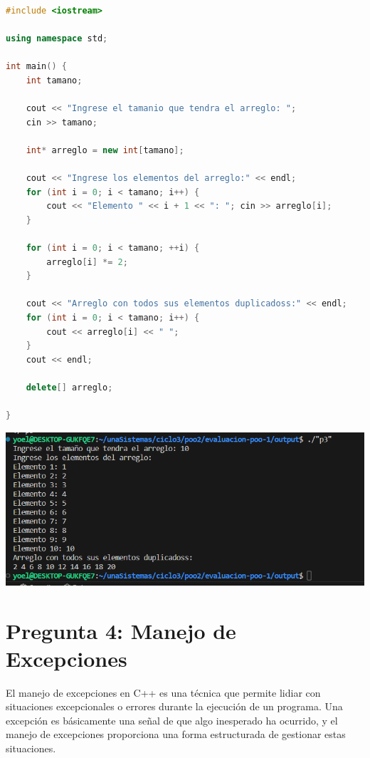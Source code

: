 \documentclass[11pt,a4paper]{article}
\begin{document}
\begin{lstlisting}[language=C++, style=mystyle, caption={Pregunta 3}]
#include <iostream>

using namespace std;

int main() {
    int tamano;

    cout << "Ingrese el tamanio que tendra el arreglo: ";
    cin >> tamano;

    int* arreglo = new int[tamano];

    cout << "Ingrese los elementos del arreglo:" << endl;
    for (int i = 0; i < tamano; i++) {
        cout << "Elemento " << i + 1 << ": "; cin >> arreglo[i];
    }

    for (int i = 0; i < tamano; ++i) {
        arreglo[i] *= 2;
    }

    cout << "Arreglo con todos sus elementos duplicadoss:" << endl;
    for (int i = 0; i < tamano; i++) {
        cout << arreglo[i] << " ";
    }
    cout << endl;

    delete[] arreglo;

}
\end{lstlisting}

{\includegraphics[width=1\textwidth]{images/2-compilado.png}\par}



\section{Pregunta 4: Manejo de Excepciones}
El manejo de excepciones en C++ es una técnica que permite lidiar con situaciones excepcionales o errores durante la ejecución de un programa. Una excepción es básicamente una señal de que algo inesperado ha ocurrido, y el manejo de excepciones proporciona una forma estructurada de gestionar estas situaciones.
\end{document}
